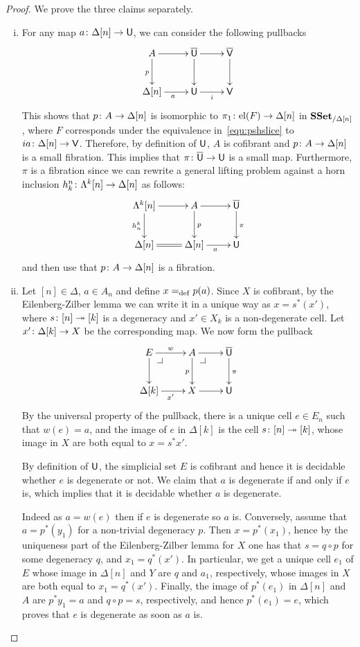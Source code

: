 \documentclass[reqno,10pt,a4paper,oneside,draft]{amsart}
\begin{document}
\begin{proof} We prove the three claims separately.
\begin{enumerate}[(i)] 
\item For any map $a \colon \Delta[n] \rightarrow \mathsf{U}$, we can consider the following pullbacks
\[
\xymatrix{
A \ar[r] \ar[d]_p  & \UU \ar[d] \ar[r]  & \VV \ar[d] \\
\Delta[n] \ar[r]_{a} & \U \ar[r]_{i} & \V }
\]
This shows that $p \colon A \rightarrow \Delta[n]$ is isomorphic to $\pi_1 \colon \mathrm{el}(F) \rightarrow \Delta[n]$ in $\mathbf{SSet}_{/ \Delta[n]}$, where $F$ corresponds under the equivalence in~\eqref{equ:pshslice} to 
$i a \colon \Delta[n] \rightarrow \mathsf{V}$. Therefore, by definition of $\mathsf{U}$, $A$ is cofibrant and $p \colon A \rightarrow \Delta[n]$ is a small fibration. This implies that $\pi \colon \overline{\mathsf{U}} \rightarrow \mathsf{U}$ is a small map. Furthermore, $\pi$ is a fibration
since we can rewrite a general lifting problem against a horn inclusion $h^n_k \colon \Lambda^k[n] \rightarrow \Delta[n]$ as follows:
\[
\xymatrix{
\Lambda^k[n] \ar[r] \ar[d]_{h^k_n} & A  \ar[d]^{p} \ar[r] & \UU \ar[d]^\pi \\
\Delta[n] \ar@{=}[r]  & \Delta[n] \ar[r]_a & \U  }
\]
and then use that $p \colon A  \to \Delta[n]$ is a fibration.
\item  Let $[n] \in \Delta$, $a \in A_n$ and define $x =_{\operatorname{def}} p(a)$. Since $X$ is cofibrant, by the Eilenberg-Zilber lemma we can write it in a unique way as $x=s^*(x')$, where $s \colon [n] \twoheadrightarrow [k]$ is a degeneracy and 
$x' \in X_k$ is a non-degenerate cell. Let $x' \colon \Delta[k] \rightarrow X$ be the corresponding map. We now form the pullback
\[
\xymatrix{
E \ar[r]^w \ar[d] \drpullback & A \ar[r] \ar[d]_{p} \drpullback & \UU \ar[d]^\pi \\
\Delta[k] \ar[r]_{x'} & X \ar[r] & \U }
\]
By the universal property of the pullback, there is a unique cell $e \in E_n$ such that $w(e)=a$, and the image of $e$ in $\Delta[k]$ is the cell $s \colon [n] \twoheadrightarrow [k]$, whose image in $X$ are both equal to $x=s^* x'$.

By definition of $\mathsf{U}$, the simplicial set $E$ is cofibrant and hence it is decidable whether $e$ is degenerate or not. We claim that $a$ is degenerate if and only if $e$ is, which implies that it is decidable whether $a$ is degenerate.

Indeed as $a = w(e)$ then if $e$ is degenerate so $a$ is. Conversely, assume that $a=p^*(y_1)$ for a non-trivial degeneracy $p$. Then $x=p^*(x_1)$, hence by the uniqueness part of the Eilenberg-Zilber lemma for $X$ one has that $s=q \circ p$ for some degeneracy $q$, and $x_1 = q^*(x')$. In particular, we get a unique cell $e_1$ of $E$ whose image in $\Delta[n]$ and $Y$ are  $q$ and $a_1$, respectively, whose images in $X$ are both equal to $x_1=q^*(x')$. Finally, the image of $p^*(e_1)$ in $\Delta[n]$ and~$A$ are  $p^* y_1 =a$ and $q \circ p =s$, respectively, and hence $p^*(e_1) =e$, which proves that $e$ is degenerate as soon as $a$ is.




\end{enumerate}
\end{proof}
\end{document}
